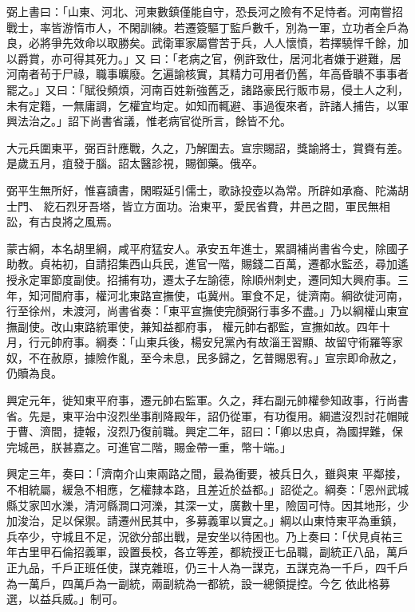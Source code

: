 \begin{pinyinscope}
 弼上書曰：「山東、河北、河東數鎮僅能自守，恐長河之險有不足恃者。河南嘗招戰士，率皆游惰市人，不閑訓練。若遷簽驅丁監戶數千，別為一軍，立功者全戶為良，必將爭先效命以取勝矣。武衛軍家屬嘗苦于兵，人人懷憤，若擇驍悍千餘，加以爵賞，亦可得其死力。」又
 曰：「老病之官，例許致仕，居河北者嫌于避難，居河南者茍于尸祿，職事曠廢。乞遍諭核實，其精力可用者仍舊，年高昏聵不事事者罷之。」又曰：「賦役頻煩，河南百姓新強舊乏，諸路豪民行販市易，侵土人之利，未有定籍，一無庸調，乞權宜均定。如知而輒避、事過復來者，許諸人捕告，以軍興法治之。」詔下尚書省議，惟老病官從所言，餘皆不允。



 大元兵圍東平，弼百計應戰，久之，乃解圍去。宣宗賜詔，獎諭將士，賞賚有差。是歲五月，疽發于腦。詔太醫診視，賜御藥。俄卒。



 弼平生無所好，惟喜讀書，閑暇延引儒士，歌詠投壺以為常。所辟如承裔、陀滿胡士門、
 紇石烈牙吾塔，皆立方面功。治東平，愛民省費，井邑之間，軍民無相訟，有古良將之風焉。



 蒙古綱，本名胡里綱，咸平府猛安人。承安五年進士，累調補尚書省今史，除國子助教。貞祐初，自請招集西山兵民，進官一階，賜錢二百萬，遷都水監丞，尋加遙授永定軍節度副使。招捕有功，遷太子左諭德，除順州刺史，遷同知大興府事。三年，知河間府事，權河北東路宣撫使，屯冀州。軍食不足，徙濟南。綱欲徙河南，行至徐州，未渡河，尚書省奏：「東平宣撫使完顏弼行事多不盡。」乃以綱權山東宣撫副使。改山東路統軍使，兼知益都府事，
 權元帥右都監，宣撫如故。四年十月，行元帥府事。綱奏：「山東兵後，楊安兒黨內有故淄王習顯、故留守術羅等家奴，不在赦原，據險作亂，至今未息，民多歸之，乞普賜恩宥。」宣宗即命赦之，仍贖為良。



 興定元年，徙知東平府事，遷元帥右監軍。久之，拜右副元帥權參知政事，行尚書省。先是，東平治中沒烈坐事削降殿年，詔仍從軍，有功復用。綱遣沒烈討花帽賊于曹、濟間，捷報，沒烈乃復前職。興定二年，詔曰：「卿以忠貞，為國捍難，保完城邑，朕甚嘉之。可進官二階，賜金帶一重，幣十端。」



 興定三年，奏曰：「濟南介山東兩路之間，最為衝要，被兵日久，雖與東
 平鄰接，不相統屬，緩急不相應，乞權隸本路，且差近於益都。」詔從之。綱奏：「恩州武城縣艾家凹水濼，清河縣澗口河濼，其深一丈，廣數十里，險固可恃。因其地形，少加浚治，足以保禦。請遷州民其中，多募義軍以實之。」綱以山東恃東平為重鎮，兵卒少，守城且不足，況欲分部出戰，是安坐以待困也。乃上奏曰：「伏見貞祐三年古里甲石倫招義軍，設置長校，各立等差，都統授正七品職，副統正八品，萬戶正九品，千戶正班任使，謀克雜班，仍三十人為一謀克，五謀克為一千戶，四千戶為一萬戶，四萬戶為一副統，兩副統為一都統，設一總領提控。今乞
 依此格募選，以益兵威。」制可。




\end{pinyinscope}
